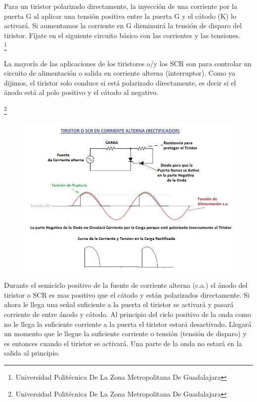 \documentclass[11pt,a4paper]{article}
\begin{document}
Para un tiristor polarizado directamente, la inyección de una corriente por la puerta G al aplicar una tensión positiva entre la puerta G y el cátodo (K) lo activará. Si aumentamos la corriente en G disminuirá la tensión de disparo del tiristor. Fíjate en el siguiente circuito básico con las corrientes y las tensiones.\\

\footnote{Universidad Politécnica De La Zona Metropolitana De Guadalajara} 

\pagebreak

La mayoría de las aplicaciones de los tiristores o/y los SCR son para controlar un circuito de alimentación o salida en corriente alterna (interruptor). Como ya dijimos, el tiristor solo conduce si está polarizado directamente, es decir si el ánodo está al polo positivo y el cátodo al negativo.

\footnote{Universidad Politécnica De La Zona Metropolitana De Guadalajara} 

\begin{figure}[hbtp]
\centering
\includegraphics[scale=0.40]{ca-ca.png}
\end{figure} 

Durante el semiciclo positivo de la fuente de corriente alterna (c.a.) el ánodo del tiristor o SCR es mas positivo que el cátodo y están polarizados directamente. Si ahora le llega una señal suficiente a la puerta el tiristor se activará y pasará corriente de entre ánodo y cátodo. Al principio del ciclo positivo de la onda como no le llega la suficiente corriente a la puerta el tiristor estará desactivado. Llegará un momento que le llegue la suficiente corriente o tensión (tensión de disparo) y es entonces cuando el tiristor se activará. Una parte de la onda no estará en la salida al principio.\\
\end{document}
